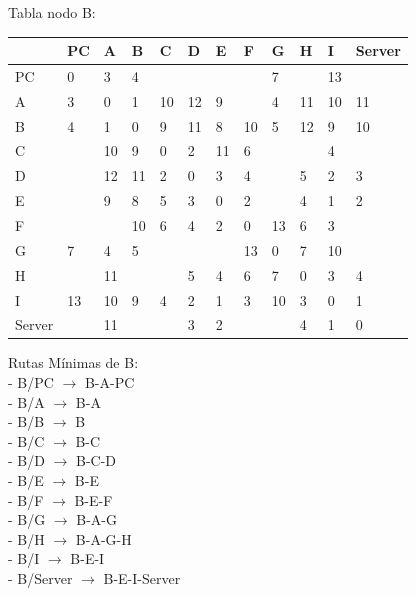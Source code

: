 \documentclass[a4paper]{article}
\begin{document}
\begin{table}[ht]
Tabla nodo B:\\
\begin{tabular}{|l|l|l|l|l|l|l|l|l|l|l|l|}
\hline
       & PC & A  & B & C & D & E & F & G & H & I  & Server \\ \hline
PC     & 0  & 3  & 4 &   &   &   &   & 7 &   & 13 &        \\ \hline
A      & 3  & 0  & 1 & 10& 12& 9 &   & 4 & 11& 10 & 11     \\ \hline
B      & 4  & 1  & 0 & 9 & 11& 8 & 10& 5 & 12& 9  & 10     \\ \hline
C      &    & 10 & 9 & 0 & 2 & 11& 6 &   &   & 4  &        \\ \hline
D      &    & 12 & 11& 2 & 0 & 3 & 4 &   & 5 & 2  & 3      \\ \hline
E      &    & 9  & 8 & 5 & 3 & 0 & 2 &   & 4 & 1  & 2      \\ \hline
F      &    &    & 10& 6 & 4 & 2 & 0 & 13& 6 & 3  &        \\ \hline
G      & 7  & 4  & 5 &   &   &   & 13& 0 & 7 & 10 &        \\ \hline
H      &    & 11 &   &   & 5 & 4 & 6 & 7 & 0 & 3  & 4      \\ \hline
I      & 13 & 10 & 9 & 4 & 2 & 1 & 3 & 10& 3 & 0  & 1      \\ \hline
Server &    & 11 &   &   & 3 & 2 &   &   & 4 & 1  & 0      \\ \hline
\end{tabular}

Rutas Mínimas de B: \\
-	B/PC  $\rightarrow$  B-A-PC\\
-	B/A  $\rightarrow$  B-A\\
-	B/B  $\rightarrow$  B\\
-	B/C  $\rightarrow$  B-C\\
-	B/D  $\rightarrow$  B-C-D\\
-	B/E  $\rightarrow$  B-E\\
-	B/F  $\rightarrow$  B-E-F\\
-	B/G  $\rightarrow$  B-A-G\\
-	B/H  $\rightarrow$  B-A-G-H\\
-	B/I  $\rightarrow$ B-E-I\\
-	B/Server  $\rightarrow$  B-E-I-Server\\
\end{table}


\clearpage
\end{document}
